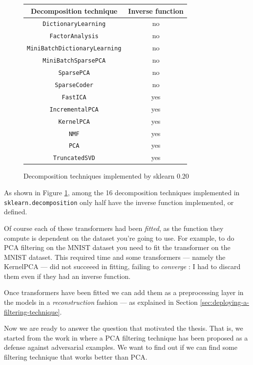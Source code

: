 \begin{figure}
  \centering
  \begin{tabular}{|c|c|}
    \hline
    Decomposition technique & Inverse function\\
    \hline
    \texttt{DictionaryLearning} & no \\
    \hline
    \texttt{FactorAnalysis} & no \\
    \hline
    \texttt{MiniBatchDictionaryLearning} & no \\
    \hline
    \texttt{MiniBatchSparsePCA} & no \\
    \hline
    \texttt{SparsePCA} & no \\
    \hline
    \texttt{SparseCoder} & no \\
    \hline
    \texttt{FastICA} & yes \\
    \hline
    \texttt{IncrementalPCA} & yes \\
    \hline
    \texttt{KernelPCA} & yes \\
    \hline
    \texttt{NMF} & yes \\
    \hline
    \texttt{PCA} & yes \\
    \hline
    \texttt{TruncatedSVD} & yes \\
    \hline
  \end{tabular}
  \caption{Decomposition techniques implemented by sklearn 0.20}
  \label{fig:decomposition-techniques}
\end{figure}

As shown in Figure \ref{fig:decomposition-techniques}, among the 16
decomposition techniques implemented in \texttt{sklearn.\-decomposition}
only half have the inverse function implemented, or defined.

Of course each of these transformers had been \emph{fitted}, as the
function they compute is dependent on the dataset you're going to use.
For example, to do PCA filtering on the MNIST dataset you need to fit
the transformer on the MNIST dataset. This required time and some
transformers --- namely the KernelPCA --- did not succeeed in fitting,
failing to \emph{converge} : I had to discard them even if they had an
inverse function.

Once transformers have been fitted we can add them as a preprocessing
layer in the models in a \emph{reconstruction} fashion --- as explained
in Section \ref{sec:deploying-a-filtering-technique}.

Now we are ready to answer the question that motivated the thesis. That
is, we started from the work in \cite{bhagoji2018enhancing} where a PCA
filtering technique has been proposed as a defense against adversarial
examples. We want to find out if we can find some filtering technique
that works better than PCA.

